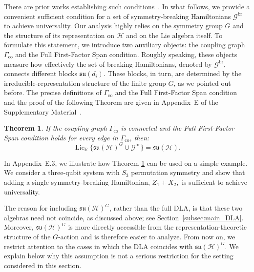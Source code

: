 \documentclass[10pt,twocolumn,superscriptaddress,aps,amsmath,amssymb,citeautoscript,floatfix,prx,longbibliography]{revtex4-2}
\newcounter{alg}
\newtheorem{theorem}{Theorem}
\theoremstyle{plain}
\theoremstyle{plain}
\theoremstyle{plain}
\theoremstyle{plain}
\theoremstyle{plain}
\theoremstyle{plain}
\begin{document}
There are prior works establishing such conditions~\cite{Hu2025, AlbertiniDAlessandro2025}. In what follows, we provide a convenient sufficient condition for a set of symmetry-breaking Hamiltonians $\mathcal{G}^\text{br}$ to achieve universality. Our analysis highly relies on the symmetry group $G$ and the structure of its representation on $\mathcal{H}$ and on the Lie algebra itself. To formulate this statement, we introduce two auxiliary objects: the coupling graph \(\Gamma_{\mathrm{co}}\) and the Full First-Factor Span condition. Roughly speaking, these objects measure how effectively the set of breaking Hamiltonians, denoted by \(\mathcal{G}^{\text{br}}\), connects different blocks \(\mathfrak{su}(d_i)\). These blocks, in turn, are determined by the irreducible-representation structure of the finite group \(G\), as we pointed out before. The precise definitions of \(\Gamma_{\mathrm{co}}\) and the Full First-Factor Span condition and the proof of the following Theorem are given in Appendix~E of the Supplementary Material~\cite{SuppMat}.

\begin{theorem}\label{thm:breakers_suff_cond}
    If the coupling graph $\Gamma_{\mathrm{co}}$ is connected and the Full First-Factor Span condition holds for every edge in $\Gamma_{\mathrm{co}}$, then:
    \begin{equation*}
        \operatorname{Lie}_{\mathbb{R}}\{\mathfrak{su}(\mathcal{H})^G \cup \mathcal{G}^{\text{br}}\} = \mathfrak{su}(\mathcal{H}).
    \end{equation*}
\end{theorem}

In Appendix~E.3, we illustrate how Theorem \ref{thm:breakers_suff_cond} can be used on a simple example. We consider a three-qubit system with \(S_3\) permutation symmetry and show that adding a single symmetry-breaking Hamiltonian,
$
    Z_1+X_2,
$
is sufficient to achieve universality.

The reason for including \(\mathfrak{su}(\mathcal H)^G\), rather than the full DLA, is that these two algebras need not coincide, as discussed above; see Section~\ref{subsec:main_DLA}.
Moreover, \(\mathfrak{su}(\mathcal H)^G\) is more directly accessible from the representation-theoretic structure of the \(G\)-action and is therefore easier to analyze. From now on, we restrict attention to the cases in which the DLA coincides with \(\mathfrak{su}(\mathcal H)^G\). We explain below why this assumption is not a serious restriction for the setting considered in this section.
\end{document}
